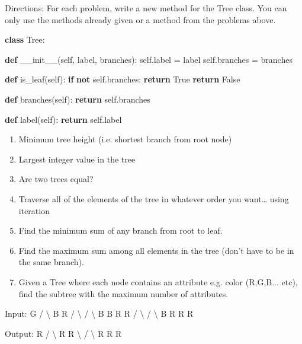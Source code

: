\documentclass[11pt]{article}
\providecommand{\tightlist}{%
      \setlength{\itemsep}{0pt}\setlength{\parskip}{0pt}}
\newenvironment{Shaded}{}{}
\newcommand{\KeywordTok}[1]{\textcolor[rgb]{0.00,0.44,0.13}{\textbf{{#1}}}}
\newcommand{\FunctionTok}[1]{\textcolor[rgb]{0.02,0.16,0.49}{{#1}}}
\newcommand{\NormalTok}[1]{{#1}}
\newcommand{\VariableTok}[1]{\textcolor[rgb]{0.10,0.09,0.49}{{#1}}}
\newcommand{\ControlFlowTok}[1]{\textcolor[rgb]{0.00,0.44,0.13}{\textbf{{#1}}}}
\newcommand{\OperatorTok}[1]{\textcolor[rgb]{0.40,0.40,0.40}{{#1}}}
\begin{document}
Directions: For each problem, write a new method for the Tree class. You
can only use the methods already given or a method from the problems
above.

\begin{Shaded}
\begin{Highlighting}[]
\KeywordTok{class}\NormalTok{ Tree:}
    
    \KeywordTok{def} \FunctionTok{__init__}\NormalTok{(}\VariableTok{self}\NormalTok{, label, branches):}
        \VariableTok{self}\NormalTok{.label }\OperatorTok{=}\NormalTok{ label}
        \VariableTok{self}\NormalTok{.branches }\OperatorTok{=}\NormalTok{ branches}

    \KeywordTok{def}\NormalTok{ is_leaf(}\VariableTok{self}\NormalTok{):}
        \ControlFlowTok{if} \KeywordTok{not} \VariableTok{self}\NormalTok{.branches:}
            \ControlFlowTok{return} \VariableTok{True}
        \ControlFlowTok{return} \VariableTok{False}

    \KeywordTok{def}\NormalTok{ branches(}\VariableTok{self}\NormalTok{):}
        \ControlFlowTok{return} \VariableTok{self}\NormalTok{.branches}

    \KeywordTok{def}\NormalTok{ label(}\VariableTok{self}\NormalTok{):}
        \ControlFlowTok{return} \VariableTok{self}\NormalTok{.label}
\end{Highlighting}
\end{Shaded}

\begin{enumerate}
\def\labelenumi{\arabic{enumi}.}
\tightlist
\item
  Minimum tree height (i.e. shortest branch from root node)
\item
  Largest integer value in the tree
\item
  Are two trees equal?
\item
  Traverse all of the elements of the tree in whatever order you
  want\ldots{} using iteration
\item
  Find the minimum sum of any branch from root to leaf.
\item
  Find the maximum sum among all elements in the tree (don't have to be
  in the same branch).
\item
  Given a Tree where each node contains an attribute e.g. color
  (R,G,B... etc), find the subtree with the maximum number of
  attributes.
\end{enumerate}

\begin{Shaded}
\begin{Highlighting}[]
\NormalTok{Input: }
\NormalTok{G }
\OperatorTok{/} \OperatorTok{\textbackslash{}} 
\NormalTok{B  R }
\OperatorTok{/} \OperatorTok{\textbackslash{}} \OperatorTok{/} \OperatorTok{\textbackslash{}} 
\NormalTok{B B R R }
\OperatorTok{/} \OperatorTok{\textbackslash{}} \OperatorTok{/} \OperatorTok{\textbackslash{}} 
\NormalTok{B R R R }

\NormalTok{Output: }
\NormalTok{R }
\OperatorTok{/} \OperatorTok{\textbackslash{}} 
\NormalTok{R R }
\OperatorTok{\textbackslash{}} \OperatorTok{/} \OperatorTok{\textbackslash{}} 
\NormalTok{R R R}
\end{Highlighting}
\end{Shaded}


    
    
    
    
\end{document}
